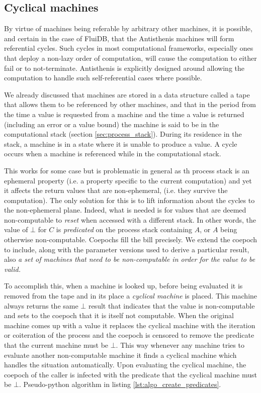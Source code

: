 \subsection{Cyclical machines}
\label{sec:cyclical_machines}

By virtue of machines being referable by arbitrary other machines, it
is possible, and certain in the case of FluiDB, that the Antisthenis
machines will form referential cycles. Such cycles in most
computational frameworks, especially ones that deploy a non-lazy order
of computation, will cause the computation to either fail or to
not-terminate. Antisthenis is explicitly designed around allowing the
computation to handle such self-referential cases where possible.

We already discussed that machines are stored in a
data structure called a tape that allows them to be referenced by
other machines, and that in the period from the time a value is
requested from a machine and the time a value is returned (including an
error or a value bound) the machine is said to be in the computational
stack (section \ref{sec:process_stack}). During its
residence in the stack, a machine is in a state where it is unable to
produce a value. A cycle occurs when a machine is referenced while in
the computational stack.

This works for some case but is problematic in general as th process stack is
an ephemeral property (i.e. a property specific to the current computation)
and yet it affects the return values that are
non-ephemeral, (i.e. they survive the computation).
The only solution for this is to lift information about
the cycles to the non-ephemeral plane. Indeed, what is needed is for values that are deemed
non-computable to \emph{reset} when accessed with a different
stack. In other words, the value of \(\bot\) for \(C\) is
\emph{predicated} on the process stack containing \(A\), or \(A\)
being otherwise non-computable. Coepochs fill the bill precisely. We
extend the coepoch to include, along with the parameter versions used
to derive a particular result, also \emph{a set of machines that need
  to be non-computable in order for the value to be valid.}

To accomplish this, when a machine is looked up, before being evaluated
it is removed from the tape and in its place a \emph{cyclical machine}
is placed. This machine always returns the same \(\bot\) result that
indicates that the value is non-computable and sets to the coepoch
that it is itself not computable. When the original machine comes up
with a value it replaces the cyclical machine with the iteration or
coiteration of the process and the coepoch is censored to remove the
predicate that the current machine must be \(\bot\). This way whenever
any machine tries to evaluate another non-computable machine it finds
a cyclical machine which handles the situation automatically. Upon
evaluating the cyclical machine, the coepoch of the caller is infected
with the predicate that the cyclical machine must be
\(\bot\). Pseudo-python algorithm in listing
\ref{lst:algo_create_predicates}.

